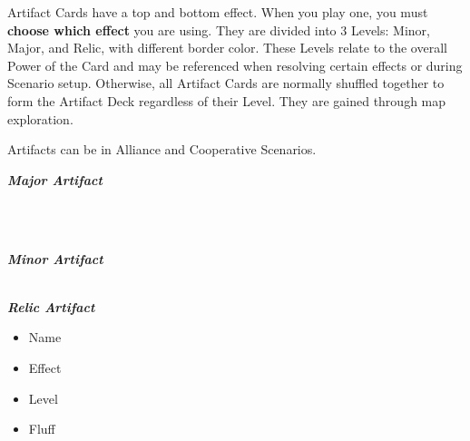 \begin{multicols*}{2}
Artifact Cards have a top and bottom effect. When you play one, you must \textbf{choose which effect} you are using.
They are divided into 3 Levels: Minor, Major, and Relic, with different border color.
These Levels relate to the overall Power of the Card and may be referenced when resolving certain effects or during Scenario setup.
Otherwise, all Artifact Cards are normally shuffled together to form the Artifact Deck regardless of their Level.
They are gained through map exploration.\par
Artifacts can be  in Alliance and Cooperative Scenarios.\par
\begin{multicols*}{2}
  \begin{scriptsize}
  \end{scriptsize}
  \footnotesize
    \null\hfill\textbf{\textit{\textcolor{darkcandyapplered}{Major Artifact}}}
  \columnbreak
  \begin{center}
    \phantom{\ldots}\\
    \phantom{\ldots}
    \begin{scriptsize}
    \end{scriptsize}\\
    \phantom{\ldots}\textbf{\textit{\textcolor{darkcandyapplered}{Minor Artifact}}}\\
    \vspace{3em}
    \phantom{\ldots}
    \begin{scriptsize}
    \end{scriptsize}\\
    \phantom{\ldots}\textbf{\textit{\textcolor{darkcandyapplered}{Relic Artifact}}}
  \end{center}
\end{multicols*}
\begin{multicols}{2}
  \footnotesize
  \begin{itemize}
    \item[\textbf{1.}] Name
    \item[\textbf{2.}] Effect
    \columnbreak
    \item[\textbf{3.}] Level
    \item[\textbf{4.}] Fluff
  \end{itemize}
\end{multicols}


\end{multicols*}

